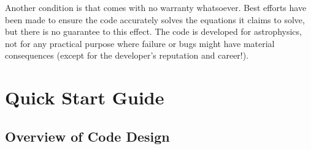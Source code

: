 \documentclass[a4paper,11pt]{report}
\begin{document}
Another condition is that \pion{} comes with no warranty whatsoever.
Best efforts have been made to ensure the code accurately solves the equations it claims to solve, but there is no guarantee to this effect.
The code is developed for astrophysics, not for any practical purpose where failure or bugs might have material consequences (except for the developer's reputation and career!).

\newpage
{}
\tableofcontents
\newpage


\chapter{Quick Start Guide}

\section{Overview of Code Design}
\end{document}
